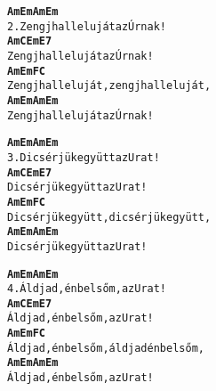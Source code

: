 \begin{minipage}{\textwidth}
\kottastart
{}
\kottaend
\begin{minipage}{\textwidth}
\begin{multicols}{2}
\begin{minipage}{\textwidth}
\begin{alltt}
\textbf{    Am         Em         Am  Em}
2. Zengj halleluját az Úrnak!
\textbf{    Am         C          Em    E7}
   Zengj halleluját az Úrnak!
\textbf{    Am         Em     F          C}
   Zengj halleluját, zengj halleluját,
\textbf{    Am         Em         Am  Em}
   Zengj halleluját az Úrnak!
\end{alltt}
\vspace{0.0cm}
\versszakspacing
\end{minipage}
\begin{minipage}{\textwidth}
\begin{alltt}
\textbf{    Am       Em          Am  Em}
3. Dicsérjük együtt az Urat!
\textbf{    Am       C           Em   E7}
   Dicsérjük együtt az Urat!
\textbf{    Am       Em       F        C}
   Dicsérjük együtt, dicsérjük együtt,
\textbf{    Am       Em          Am  Em}
   Dicsérjük együtt az Urat!
\end{alltt}
\vspace{0.0cm}
\versszakspacing
\end{minipage}
\begin{minipage}{\textwidth}
\begin{alltt}
\textbf{   Am          Em          Am   Em}
4. Áldjad, én belsőm, az Urat!
\textbf{   Am          C           Em   E7}
   Áldjad, én belsőm, az Urat!
\textbf{   Am          Em     F          C}
   Áldjad, én belsőm, áldjad én belsőm,
\textbf{   Am          Em          Am  Em}
   Áldjad, én belsőm, az Urat!
\end{alltt}
\vspace{0.0cm}
\versszakspacing
\end{minipage}
\vspace{0.2cm}
\end{multicols}
\end{minipage}

\end{minipage}
~\vspace{1.0cm}
\newline
